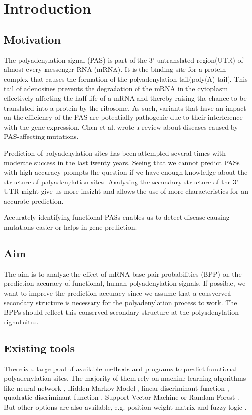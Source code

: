 \section{Introduction}

\subsection{Motivation}
The polyadenylation signal (PAS) is part of the 3' untranslated region(UTR) of almost every messenger RNA (mRNA). It is the binding site for a protein complex that causes the formation of the polyadenylation tail(poly(A)-tail). This tail of adenosines prevents the degradation of the mRNA in the cytoplasm effectively affecting the half-life of a mRNA and thereby raising the chance to be translated into a protein by the ribosome. As such, variants that have an impact on the efficiency of the PAS are potentially pathogenic due to their interference with the gene expression. Chen et al. wrote a review about diseases caused by PAS-affecting mutations.  

Prediction of polyadenylation sites has been attempted several times with moderate success in the last twenty years.  Seeing that we cannot predict PASs with high accuracy prompts the question if we have enough knowledge about the structure of polyadenylation sites. Analyzing the secondary structure of the 3' UTR might give us more insight and allows the use of more characteristics for an accurate prediction.

Accurately identifying functional PASs enables us to detect disease-causing mutations easier or helps in gene prediction.  


\subsection{Aim}
The aim is to analyze the effect of mRNA base pair probabilities (BPP) on the prediction accuracy of functional, human polyadenylation signals. If possible, we want to improve the prediction accuracy since we assume that a consverved secondary structure is necessary for the polyadenylation process to work. The BPPs should reflect this conserved secondary structure at the polyadenylation signal sites.

 
\subsection{Existing tools}
There is a large pool of available methods and programs to predict functional polyadenylation sites. The majority of them rely on machine learning algorithms like neural network \citep{pmid8867844}, Hidden Markov Model \citep{pmid11937640, pmid15247332}, linear discriminant function \citep{pmid9088705}, quadratic discriminant function \citep{pmid10231571}, Support Vector Machine \citep{pmid15706523, pmid16870936} or Random Forest \citep{pmid23616439}. But other options are also available, e.g. position weight matrix \citep{pmid12600277} and fuzzy logic \citep{pmid19393560}.

